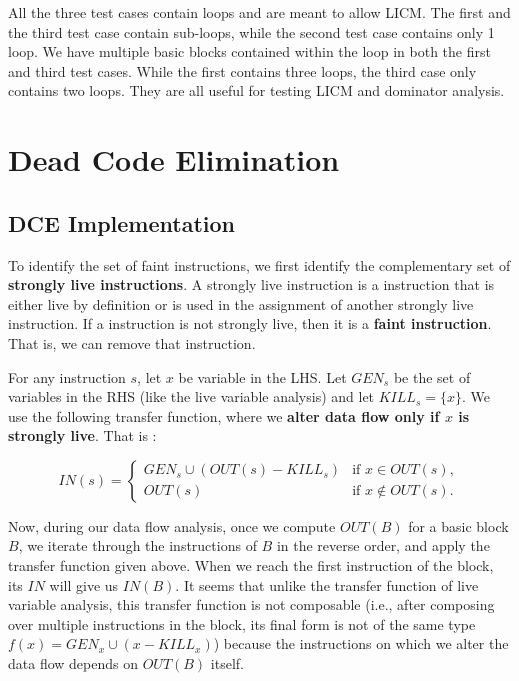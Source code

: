 All the three test cases contain loops and are meant to allow LICM.
The first and the third test case contain sub-loops, while the second test case contains only 1 loop.
We have multiple basic blocks contained within the loop in both the first and third test cases.
While the first contains three loops, the third case only contains two loops.
They are all useful for testing LICM and dominator analysis.

\section{Dead Code Elimination}

\subsection{DCE Implementation}

To identify the set of faint instructions, we first identify the complementary set of \textbf{strongly live instructions}.
A strongly live instruction is a instruction that is either live by definition or is used in the assignment of another
strongly live instruction.
If a instruction is not strongly live, then it is a \textbf{faint instruction}.
That is, we can remove that instruction.

For any instruction $s$, let $x$ be variable in the LHS. Let $GEN_s$ be the set of variables in the RHS (like the live variable analysis) and
let $KILL_s = \{x\}$. We use the following transfer function, where we \textbf{alter data flow only if $x$ is strongly live}. That is :

\[
IN(s) = \left\{ 
\begin{array}{ll}
GEN_s \cup (OUT(s)-KILL_s) & \mbox{if } x \in OUT(s),\\
OUT(s) & \mbox{if } x \notin OUT(s).
\end{array}
\right.
\]

Now, during our data flow analysis, once we compute $OUT(B)$ for a basic block $B$, we iterate through the instructions of $B$ in the reverse order, and apply the transfer function given above. When we reach the first instruction of the block, its $IN$ will give us $IN(B)$. It seems that unlike the transfer function of live variable analysis, this transfer function is not composable (i.e., after composing over multiple instructions in the block, its final form is not of the same type $f(x) = GEN_x \cup (x-KILL_x)$) because the instructions on which we alter the data flow depends on $OUT(B)$ itself.\\  


